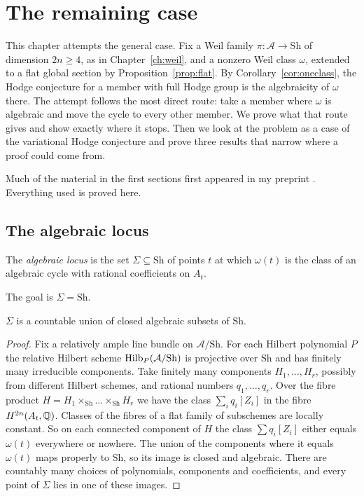 \chapter{The remaining case}\label{ch:remaining}

This chapter attempts the general case. Fix a Weil family
$\pi\colon\mathcal A\to\mathrm{Sh}$ of dimension $2n\ge4$, as in
Chapter~\ref{ch:weil}, and a nonzero Weil class $\omega$, extended to a flat
global section by Proposition~\ref{prop:flat}. By
Corollary~\ref{cor:oneclass}, the Hodge conjecture for a member with full
Hodge group is the algebraicity of $\omega$ there. The attempt follows the
most direct route: take a member where $\omega$ is algebraic and move the
cycle to every other member. We prove what that route gives and show
exactly where it stops. Then we look at the problem as a case of the
variational Hodge conjecture and prove three results that narrow where a
proof could come from.

Much of the material in the first sections first appeared in my preprint
\cite{BhH8}. Everything used is proved here.

\section{The algebraic locus}

\begin{definition}
The \emph{algebraic locus} is the set $\Sigma\subseteq\mathrm{Sh}$ of points
$t$ at which $\omega(t)$ is the class of an algebraic cycle with rational
coefficients on $A_{t}$.
\end{definition}

The goal is $\Sigma=\mathrm{Sh}$.

\begin{lemma}\label{lem:countablebook}
$\Sigma$ is a countable union of closed algebraic subsets of $\mathrm{Sh}$.
\end{lemma}

\begin{proof}
Fix a relatively ample line bundle on $\mathcal A/\mathrm{Sh}$. For each Hilbert
polynomial $P$ the relative Hilbert scheme $\operatorname{Hilb}_{P}(\mathcal A/\mathrm{Sh})$ is
projective over $\mathrm{Sh}$ and has finitely many irreducible components. Take
finitely many components $H_{1},\dots,H_{r}$, possibly from different
Hilbert schemes, and rational numbers $q_{1},\dots,q_{r}$. Over the fibre
product $H=H_{1}\times_{\mathrm{Sh}}\dots\times_{\mathrm{Sh}}H_{r}$ we have the
class $\sum_{i}q_{i}[Z_{i}]$ in the fibre $H^{2n}(A_{t},\mathbb{Q})$. Classes of
the fibres of a flat family of subschemes are locally constant. So on each
connected component of $H$ the class $\sum q_{i}[Z_{i}]$ either equals
$\omega(t)$ everywhere or nowhere. The union of the components where it
equals $\omega(t)$ maps properly to $\mathrm{Sh}$, so its image is closed and
algebraic. There are countably many choices of polynomials, components
and coefficients, and every point of $\Sigma$ lies in one of these images.
\end{proof}

